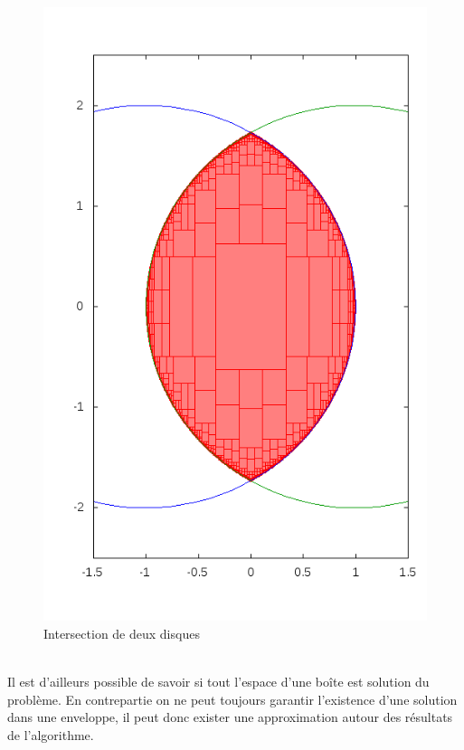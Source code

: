\begin{figure}[ht!] %
  \center
\includegraphics[scale=0.50]{img/disk-disk}
  \caption{Intersection de deux disques} %
 \label{fig:DisqueDisque} %
\end{figure} %
\\
 Il est d'ailleurs possible de savoir si tout l'espace d'une boîte est solution du problème. En contrepartie on ne peut toujours garantir l'existence d'une solution dans une enveloppe, il peut donc exister une approximation autour des résultats de l'algorithme.

 \clearpage
 
